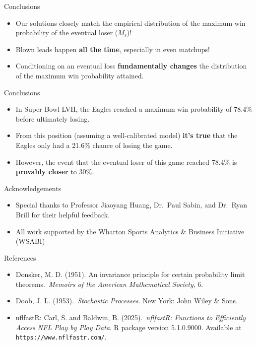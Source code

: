 \documentclass{beamer}
\begin{document}
\begin{frame}{Conclusions}
  \begin{itemize}
    \item Our solutions closely match the empirical distribution of the maximum win probability of the eventual loser ($M_\ell$)!
    \pause
    \item Blown leads happen \textbf{all the time}, especially in even matchups!
    \pause
    \item Conditioning on an eventual loss \textbf{fundamentally changes} the distribution of the maximum win probability attained.
  \end{itemize}
\end{frame}

\begin{frame}{Conclusions}
  \begin{itemize}
    \item In Super Bowl LVII, the Eagles reached a maximum win probability of 78.4\% before ultimately losing.
    \pause
    \item From this position (assuming a well-calibrated model) \textbf{it's true} that the Eagles only had a 21.6\% chance of losing the game.
    \pause
    \item However, the event that the eventual loser of this game reached 78.4\% is \textbf{provably closer} to 30\%.
  \end{itemize}
\end{frame}

\begin{frame}{Acknowledgements}
\begin{itemize}
  \item Special thanks to Professor Jiaoyang Huang, Dr.\ Paul Sabin, and Dr.\ Ryan Brill for their helpful feedback.
  \item All work supported by the Wharton Sports Analytics \& Business Initiative (WSABI)
\end{itemize}
\end{frame}

\begin{frame}{References}
  \footnotesize
  \begin{itemize}
    \item Donsker, M. D. (1951). An invariance principle for certain probability limit theorems.\ \emph{Memoirs of the American Mathematical Society}, 6.
    \item Doob, J. L. (1953).\ \emph{Stochastic Processes}. New York: John Wiley \& Sons.
    \item nflfastR: Carl, S. and Baldwin, B. (2025).\ \emph{nflfastR: Functions to Efficiently Access NFL Play by Play Data}. R package version 5.1.0.9000. Available at \texttt{https://www.nflfastr.com/}.
  \end{itemize}
  \end{frame}
\end{document}
